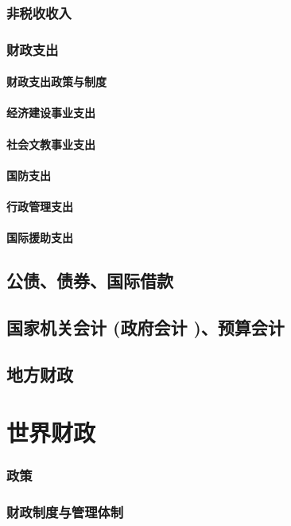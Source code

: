 \documentclass[UTF8]{../../RepresentationUniverse}
\begin{document}
        \subsubsection{非税收收入}
        \subsubsection{财政支出}
            \paragraph{财政支出政策与制度}
            \paragraph{经济建设事业支出}
            \paragraph{社会文教事业支出}
            \paragraph{国防支出}
            \paragraph{行政管理支出}
            \paragraph{国际援助支出}
    \subsection{公债、债券、国际借款}
    \subsection{国家机关会计 (政府会计 )、预算会计}
    \subsection{地方财政}


\section{世界财政}
    \subsubsection{政策}
    \subsubsection{财政制度与管理体制}
\end{document}
